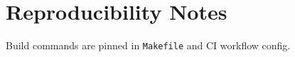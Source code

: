 \chapter{Reproducibility Notes}
Build commands are pinned in \texttt{Makefile} and CI workflow config.
